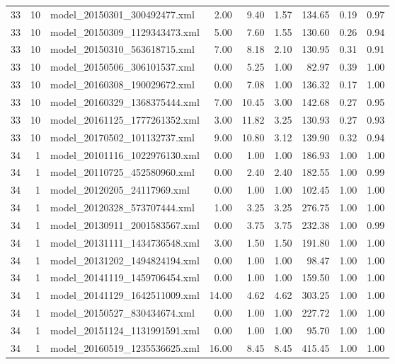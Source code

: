 \begin{table}[ht]
\begin{tabular}{rrlrrrrrr}
   33 &  10 & model\_20150301\_300492477.xml & 2.00 & 9.40 & 1.57 & 134.65 & 0.19 & 0.97 \\ 
   33 &  10 & model\_20150309\_1129343473.xml & 5.00 & 7.60 & 1.55 & 130.60 & 0.26 & 0.94 \\ 
   33 &  10 & model\_20150310\_563618715.xml & 7.00 & 8.18 & 2.10 & 130.95 & 0.31 & 0.91 \\ 
   33 &  10 & model\_20150506\_306101537.xml & 0.00 & 5.25 & 1.00 & 82.97 & 0.39 & 1.00 \\ 
   33 &  10 & model\_20160308\_190029672.xml & 0.00 & 7.08 & 1.00 & 136.32 & 0.17 & 1.00 \\ 
   33 &  10 & model\_20160329\_1368375444.xml & 7.00 & 10.45 & 3.00 & 142.68 & 0.27 & 0.95 \\ 
   33 &  10 & model\_20161125\_1777261352.xml & 3.00 & 11.82 & 3.25 & 130.93 & 0.27 & 0.93 \\ 
   33 &  10 & model\_20170502\_101132737.xml & 9.00 & 10.80 & 3.12 & 139.90 & 0.32 & 0.94 \\ 
   34 &   1 & model\_20101116\_1022976130.xml & 0.00 & 1.00 & 1.00 & 186.93 & 1.00 & 1.00 \\ 
   34 &   1 & model\_20110725\_452580960.xml & 0.00 & 2.40 & 2.40 & 182.55 & 1.00 & 0.99 \\ 
   34 &   1 & model\_20120205\_24117969.xml & 0.00 & 1.00 & 1.00 & 102.45 & 1.00 & 1.00 \\ 
   34 &   1 & model\_20120328\_573707444.xml & 1.00 & 3.25 & 3.25 & 276.75 & 1.00 & 1.00 \\ 
   34 &   1 & model\_20130911\_2001583567.xml & 0.00 & 3.75 & 3.75 & 232.38 & 1.00 & 0.99 \\ 
   34 &   1 & model\_20131111\_1434736548.xml & 3.00 & 1.50 & 1.50 & 191.80 & 1.00 & 1.00 \\ 
   34 &   1 & model\_20131202\_1494824194.xml & 0.00 & 1.00 & 1.00 & 98.47 & 1.00 & 1.00 \\ 
   34 &   1 & model\_20141119\_1459706454.xml & 0.00 & 1.00 & 1.00 & 159.50 & 1.00 & 1.00 \\ 
   34 &   1 & model\_20141129\_1642511009.xml & 14.00 & 4.62 & 4.62 & 303.25 & 1.00 & 1.00 \\ 
   34 &   1 & model\_20150527\_830434674.xml & 0.00 & 1.00 & 1.00 & 227.72 & 1.00 & 1.00 \\ 
   34 &   1 & model\_20151124\_1131991591.xml & 0.00 & 1.00 & 1.00 & 95.70 & 1.00 & 1.00 \\ 
   34 &   1 & model\_20160519\_1235536625.xml & 16.00 & 8.45 & 8.45 & 415.45 & 1.00 & 1.00 \\ 

\end{tabular}
\end{table}
